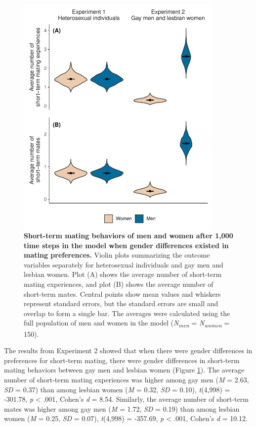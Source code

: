 \documentclass[
  11pt,
]{article}
\begin{document}
\begin{figure}[h]
  \centering
  \includegraphics[width=100mm]{figures/fig1_men_vs_women.pdf}
  \caption{\textbf{Short-term mating behaviors of men and women after 1,000 time steps in the model when gender differences existed in mating preferences.} Violin plots summarizing the outcome variables separately for heterosexual individuals and gay men and lesbian women. Plot (A) shows the average number of short-term mating experiences, and plot (B) shows the average number of short-term mates. Central points show mean values and whiskers represent standard errors, but the standard errors are small and overlap to form a single bar. The averages were calculated using the full population of men and women in the model (\textit{N\textsubscript{men}} = \textit{N\textsubscript{women}} = 150).}
  \label{fig:men_vs_women}
\end{figure}

The results from Experiment 2 showed that when there were gender
differences in preferences for short-term mating, there were gender
differences in short-term mating behaviors between gay men and lesbian
women (Figure \ref{fig:men_vs_women}). The average number of short-term
mating experiences was higher among gay men (\emph{M} = 2.63, \emph{SD}
= 0.37) than among lesbian women (\emph{M} = 0.32, \emph{SD} = 0.10),
\emph{t}(4,998) = -301.78, \emph{p} \textless{} .001, Cohen's \emph{d} =
8.54. Similarly, the average number of short-term mates was higher among
gay men (\emph{M} = 1.72, \emph{SD} = 0.19) than among lesbian women
(\emph{M} = 0.25, \emph{SD} = 0.07), \emph{t}(4,998) = -357.69, \emph{p}
\textless{} .001, Cohen's \emph{d} = 10.12.
\end{document}
